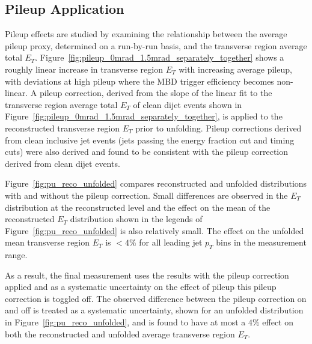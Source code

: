 \subsection{Pileup Application}
\label{sec:pileup_application}

Pileup effects are studied by examining the relationship between the average pileup proxy, determined on a run-by-run basis, and the transverse region average total $E_{T}$. 
Figure~\ref{fig:pileup_0mrad_1.5mrad_separately_together} shows a roughly linear increase in transverse region $E_{T}$ with increasing average pileup, with deviations at high pileup where the MBD trigger efficiency becomes non-linear.
A pileup correction, derived from the slope of the linear fit to the transverse region average total $E_{T}$ of clean dijet events shown in Figure~\ref{fig:pileup_0mrad_1.5mrad_separately_together}, is applied to the reconstructed transverse region $E_{T}$ prior to unfolding. 
Pileup corrections derived from clean inclusive jet events (jets passing the energy fraction cut and timing cuts) were also derived and found to be consistent with the pileup correction derived from clean dijet events.

Figure~\ref{fig:pu_reco_unfolded} compares reconstructed and unfolded distributions with and without the pileup correction. 
Small differences are observed in the $E_{T}$ distribution at the reconstructed level and the effect on the mean of the reconstructed $E_{T}$ distribution shown in the legends of Figure~\ref{fig:pu_reco_unfolded} is also relatively small.
The effect on the unfolded mean transverse region $E_{T}$ is $<4\%$ for all leading jet $p_{T}$ bins in the measurement range.  

As a result, the final measurement uses the results with the pileup correction applied and as a systematic uncertainty on the effect of pileup this pileup correction is toggled off.
The observed difference between the pileup correction on and off is treated as a systematic uncertainty, shown for an unfolded distribution in Figure~\ref{fig:pu_reco_unfolded}, and is found to have at most a $4\%$ effect on both the reconstructed and unfolded average transverse region $E_{T}$.
 
